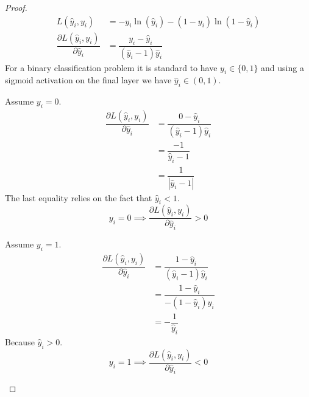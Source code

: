 \begin{proof}

\begin{align}
    L(\hat y_i,  y_i) 
    &= -  y_i \ln(\hat y_i) - (1 - y_i)\ln(1 - \hat y_i)\\
    \dfrac{\partial L(\hat y_i,  y_i)}{\partial \hat y_i} &= \dfrac{y_i - \hat y_i}{(\hat y_i - 1) \hat y_i}
\end{align}
For a binary classification problem it is standard to have $y_i \in \{0, 1\}$ and using a sigmoid activation on the final layer we have $\hat y_i \in (0, 1)$. \\

\begin{center}
    
\begin{minipage}{0.45\textwidth}
Assume $y_i = 0$.
\begin{align}
    \dfrac{\partial L(\hat y_i,  y_i)}{\partial \hat y_i} &= \dfrac{0 - \hat y_i}{(\hat y_i - 1) \hat y_i}\\
    &= \dfrac{-1}{\hat y_i - 1}\\
    &= \dfrac{1}{|\hat y_i - 1|}
\end{align}
The last equality relies on the fact that $\hat y_i < 1$.
\begin{equation}
    y_i = 0 \implies \dfrac{\partial L(\hat y_i,  y_i)}{\partial \hat y_i} > 0
\end{equation}
\end{minipage}
\hspace{0.04\textwidth}
\begin{minipage}{0.45\textwidth}
Assume $y_i = 1$.
\begin{align}
    \dfrac{\partial L(\hat y_i,  y_i)}{\partial \hat y_i} &= \dfrac{1 - \hat y_i}{(\hat y_i - 1) \hat y_i}\\
    &= \dfrac{1 - \hat y_i}{-(1-\hat y_i) \hat y_i}\\
    &= -\dfrac{1}{\hat y_i}
\end{align}
Because $\hat y_i > 0$.
\begin{equation}
    y_i = 1 \implies \dfrac{\partial L(\hat y_i,  y_i)}{\partial \hat y_i} < 0
\end{equation}
\end{minipage}
\end{center}


\end{proof}
